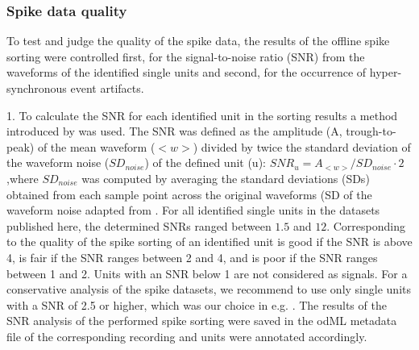 {\subsubsection{Spike data quality}
\label{sec:spike_data_quality}

To test and judge the quality of the spike data, the results of the offline spike sorting were controlled first, for the signal-to-noise ratio (SNR) from the waveforms of the identified single units and second, for the occurrence of hyper-synchronous event artifacts.

1. To calculate the SNR for each identified unit in the sorting results a method introduced by \cite{Hatsopoulos_2004} was used. The SNR was defined as the amplitude (A, trough-to-peak) of the mean waveform ($<w>$) divided by twice the standard deviation of the waveform noise ($SD_{noise}$) of the defined unit (u): $SNR_{u}=A_{<w>}/SD_{noise}\cdot2$,where $SD_{noise}$ was computed by averaging the standard deviations (SDs) obtained from each sample point across the original waveforms (SD of the waveform noise adapted from \cite{Nordhausen_1996,  Suner_2005}. For all identified single units in the datasets published here, the determined SNRs ranged between $1.5$ and $12$. Corresponding to \cite{Suner_2005} the quality of the spike sorting of an identified unit is good if the SNR is above 4, is fair if the SNR ranges between 2 and 4, and is poor if the SNR ranges between 1 and 2. Units with an SNR below 1 are not considered as signals. For a conservative analysis of the spike datasets, we recommend to use only single units with a SNR of 2.5 or higher, which was our choice in e.g. \cite{Torre_2016}. The results of the SNR analysis of the performed spike sorting were saved in the odML metadata file of the corresponding recording and units were annotated accordingly. 

}

